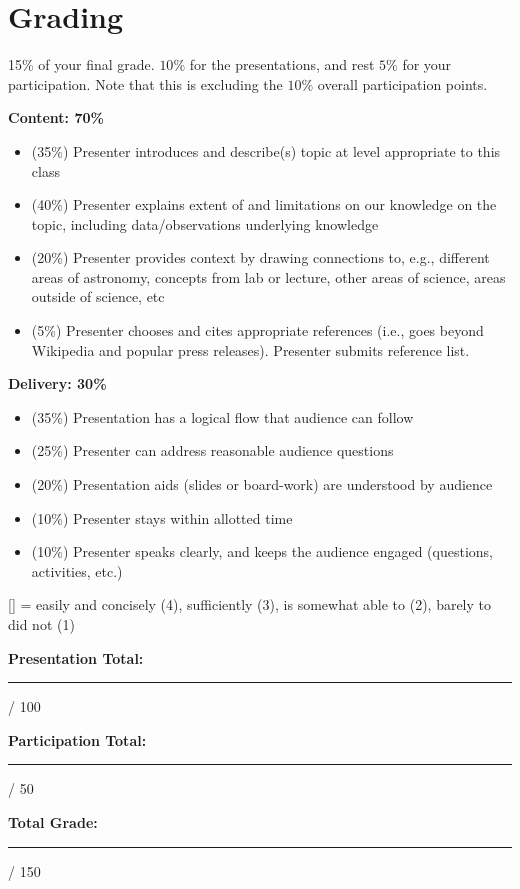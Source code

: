 \documentclass[11pt]{article}%
\begin{document}
\newpage
\section*{Grading}
15\% of your final grade.  $10\%$ for the presentations, and rest $5\%$ for your participation. Note that this is excluding the $10\%$ overall participation points.

\medskip \noindent
\textbf{Content: 70\%}
\begin{itemize}
    \item (35\%) Presenter introduces and describe(s) topic at level appropriate to this class
    \item (40\%) Presenter explains extent of and limitations on our knowledge on the topic, including data/observations underlying knowledge 
    \item (20\%) Presenter provides context by drawing connections to, e.g., different areas of astronomy, concepts from lab or
    lecture, other areas of science, areas outside of science, etc
    \item (5\%) Presenter chooses and cites appropriate references (i.e., goes beyond Wikipedia and popular press releases).  Presenter submits reference list.
\end{itemize} 

\noindent
\textbf{Delivery: 30\%}
\begin{itemize}
    \item (35\%) Presentation has a logical flow that audience can follow
    \item (25\%) Presenter can address reasonable audience questions
    \item (20\%) Presentation aids (slides or board-work) are understood by audience
    \item (10\%) Presenter stays within allotted time
    \item (10\%) Presenter speaks clearly, and keeps the audience engaged (questions, activities, etc.)
\end{itemize}

{\small [\underline{\hspace{5mm}}] = easily and concisely (4), sufficiently (3), is somewhat able to (2), barely to did not (1)}

\bigskip \noindent
\textbf{Presentation Total:} \rule{1cm}{1pt} / 100

\medskip \noindent
\textbf{Participation Total:} \rule{1cm}{1pt} / 50

\medskip \noindent
\textbf{Total Grade:} \rule{1cm}{1pt} / 150
\end{document}
